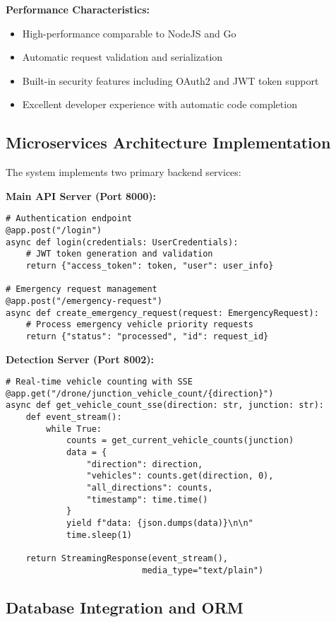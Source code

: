 \documentclass[conference]{IEEEtran}
\begin{document}
\textbf{Performance Characteristics:}
\begin{itemize}
\item High-performance comparable to NodeJS and Go
\item Automatic request validation and serialization
\item Built-in security features including OAuth2 and JWT token support
\item Excellent developer experience with automatic code completion
\end{itemize}

\subsection{Microservices Architecture Implementation}

The system implements two primary backend services:

\textbf{Main API Server (Port 8000):}
\begin{verbatim}
# Authentication endpoint
@app.post("/login")
async def login(credentials: UserCredentials):
    # JWT token generation and validation
    return {"access_token": token, "user": user_info}

# Emergency request management
@app.post("/emergency-request")
async def create_emergency_request(request: EmergencyRequest):
    # Process emergency vehicle priority requests
    return {"status": "processed", "id": request_id}
\end{verbatim}

\textbf{Detection Server (Port 8002):}
\begin{verbatim}
# Real-time vehicle counting with SSE
@app.get("/drone/junction_vehicle_count/{direction}")
async def get_vehicle_count_sse(direction: str, junction: str):
    def event_stream():
        while True:
            counts = get_current_vehicle_counts(junction)
            data = {
                "direction": direction,
                "vehicles": counts.get(direction, 0),
                "all_directions": counts,
                "timestamp": time.time()
            }
            yield f"data: {json.dumps(data)}\n\n"
            time.sleep(1)
    
    return StreamingResponse(event_stream(), 
                           media_type="text/plain")
\end{verbatim}

\subsection{Database Integration and ORM}
\end{document}
